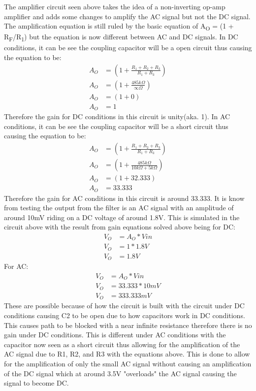 \documentclass{article}
\begin{document}
The amplifier circuit seen above takes the idea of a non-inverting op-amp amplifier and adds some changes to amplify the AC signal but not the DC signal. The amplification equation is still ruled by the basic equation of A\textsubscript{O} = (1 + R\textsubscript{F}/R\textsubscript{1}) but the equation is now different between AC and DC signals. 
In DC conditions, it can be see the coupling capacitor will be a open circuit thus causing the equation to be:
\begin{align}
A_{O} &= (1 +\frac{R_{1}+R_{2}+R_{3}}{R_{1} + R_{3}}) \\
A_{O} &= (1 +\frac{485k\Omega}{\infty\Omega}) \\
A_{O} &= (1 + 0) \\
A_{O} &= 1
\end{align}
Therefore the gain for DC conditions in this circuit is unity(aka. 1).
In AC conditions, it can be see the coupling capacitor will be a short circuit thus causing the equation to be:
\begin{align}
A_{O} &= (1 +\frac{R_{1}+R_{2}+R_{3}}{R_{1} + R_{3}}) \\
A_{O} &= (1 +\frac{485k\Omega}{10k\Omega + 5k\Omega}) \\
A_{O} &= (1 + 32.333) \\
A_{O} &= 33.333
\end{align}
Therefore the gain for AC conditions in this circuit is around 33.333.
It is know from testing the output from the filter is an AC signal with an amplitude of around 10mV riding on a DC voltage of around 1.8V.
This is simulated in the circuit above with the result from gain equations solved above being for DC:
\begin{align}
V_{O} &= A_{O} * V{in} \\
V_{O} &= 1 * 1.8V \\
V_{O} &= 1.8V
\end{align}
For AC:
\begin{align}
V_{O} &= A_{O} * V{in} \\
V_{O} &= 33.333 * 10mV \\
V_{O} &= 333.333mV
\end{align}
These are possible because of how the circuit is built with the circuit under DC conditions causing C2 to be open due to how capacitors work in DC conditions. This causes path to be blocked with a near infinite resistance therefore there is no gain under DC conditions. This is different under AC conditions with the capacitor now seen as a short circuit thus allowing for the amplification of the AC signal due to R1, R2, and R3 with the equations above. This is done to allow for the amplification of only the small AC signal without causing an amplification of the DC signal which at around 3.5V "overloads" the AC signal causing the signal to become DC. 
\end{document}
